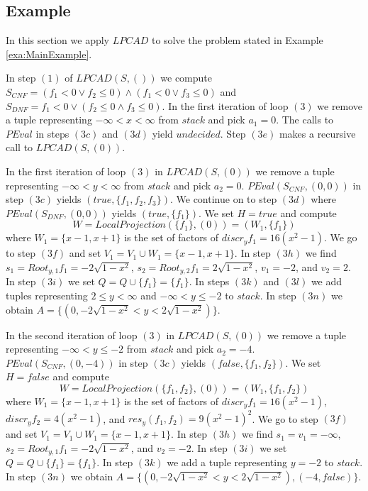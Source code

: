 \documentclass[english]{amsart}
\numberwithin{equation}{section}
\numberwithin{figure}{section}
\begin{document}
\subsection{\label{sub:Example}Example}

In this section we apply $LPCAD$ to solve the problem stated in Example
\ref{exa:MainExample}.

In step $(1)$ of $LPCAD(S,())$ we compute $S_{CNF}=(f_{1}<0\vee f_{2}\leq0)\wedge(f_{1}<0\vee f_{3}\leq0)$
and $S_{DNF}=f_{1}<0\vee(f_{2}\leq0\wedge f_{3}\leq0)$. In the first
iteration of loop $(3)$ we remove a tuple representing $-\infty<x<\infty$
from $stack$ and pick $a_{1}=0$. The calls to $PEval$ in steps
$(3c)$ and $(3d)$ yield $undecided$. Step $(3e)$ makes a recursive
call to $LPCAD(S,(0))$.

In the first iteration of loop $(3)$ in $LPCAD(S,(0))$ we remove
a tuple representing $-\infty<y<\infty$ from $stack$ and pick $a_{2}=0$.
$PEval(S_{CNF},(0,0))$ in step $(3c)$ yields $(true,\{f_{1},f_{2},f_{3}\})$.
We continue on to step $(3d)$ where $PEval(S_{DNF},(0,0))$ yields
$(true,\{f_{1}\})$. We set $H=true$ and compute \[
W=LocalProjection(\{f_{1}\},(0))=(W_{1},\{f_{1}\})\]
where $W_{1}=\{x-1,x+1\}$ is the set of factors of $discr_{y}f_{1}=16(x^{2}-1)$.
We go to step $(3f)$ and set $V_{1}=V_{1}\cup W_{1}=\{x-1,x+1\}$.
In step $(3h)$ we find $s_{1}=Root_{y,1}f_{1}=-2\sqrt{1-x^{2}}$,
$s_{2}=Root_{y,2}f_{1}=2\sqrt{1-x^{2}}$, $v_{1}=-2$, and $v_{2}=2$.
In step $(3i)$ we set $Q=Q\cup\{f_{1}\}=\{f_{1}\}$. In steps $(3k)$
and $(3l)$ we add tuples representing $2\leq y<\infty$ and $-\infty<y\leq-2$
to $stack$. In step $(3n)$ we obtain $A=\{(0,-2\sqrt{1-x^{2}}<y<2\sqrt{1-x^{2}})\}$.

In the second iteration of loop $(3)$ in $LPCAD(S,(0))$ we remove
a tuple representing $-\infty<y\leq-2$ from $stack$ and pick $a_{2}=-4$.
$PEval(S_{CNF},(0,-4))$ in step $(3c)$ yields $(false,\{f_{1},f_{2}\})$.
We set $H=false$ and compute \[
W=LocalProjection(\{f_{1},f_{2}\},(0))=(W_{1},\{f_{1},f_{2}\})\]
where $W_{1}=\{x-1,x+1\}$ is the set of factors of $discr_{y}f_{1}=16(x^{2}-1)$,
$discr_{y}f_{2}=4(x^{2}-1)$, and $res_{y}(f_{1},f_{2})=9(x^{2}-1)^{2}$.
We go to step $(3f)$ and set $V_{1}=V_{1}\cup W_{1}=\{x-1,x+1\}$.
In step $(3h)$ we find $s_{1}=v_{1}=-\infty$, $s_{2}=Root_{y,1}f_{1}=-2\sqrt{1-x^{2}}$,
and $v_{2}=-2$. In step $(3i)$ we set $Q=Q\cup\{f_{1}\}=\{f_{1}\}$.
In step $(3k)$ we add a tuple representing $y=-2$ to $stack$. In
step $(3n)$ we obtain $A=\{(0,-2\sqrt{1-x^{2}}<y<2\sqrt{1-x^{2}}),(-4,false)\}$.
\end{document}
